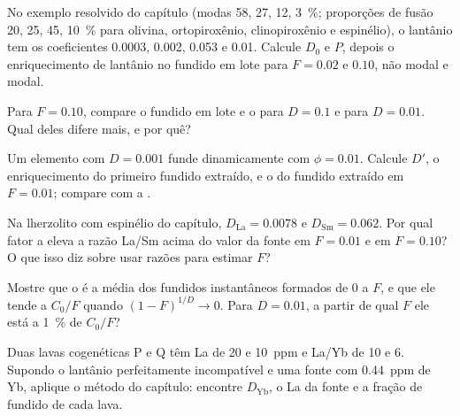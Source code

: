 \begin{exercise}[$\star\star$]\label{exo:b3:trace-element-modelling:6}
No exemplo resolvido do capítulo (modas 58, 27, 12, \qty{3}{\percent};
proporções de fusão 20, 25, 45, \qty{10}{\percent} para olivina,
ortopiroxênio, clinopiroxênio e espinélio), o lantânio tem os coeficientes
0.0003, 0.002, 0.053 e 0.01. Calcule $D_0$ e $P$, depois o enriquecimento de
lantânio no fundido em lote para $F = 0.02$ e $0.10$, não modal e modal.
\end{exercise}

\begin{exercise}[$\star\star$]\label{exo:b3:trace-element-modelling:7}
Para $F = 0.10$, compare o fundido em lote e o  para
$D = 0.1$ e para $D = 0.01$. Qual deles difere mais, e por quê?
\end{exercise}

\begin{exercise}[$\star\star$]\label{exo:b3:trace-element-modelling:8}
Um elemento com $D = 0.001$ funde dinamicamente com $\phi = 0.01$. Calcule
$D'$, o enriquecimento do primeiro fundido extraído, e o do fundido
extraído em $F = 0.01$; compare com a .
\end{exercise}

\begin{exercise}[$\star\star$]\label{exo:b3:trace-element-modelling:9}
Na lherzolito com espinélio do capítulo, $D_{\mathrm{La}} = 0.0078$ e
$D_{\mathrm{Sm}} = 0.062$. Por qual fator a  eleva a razão La/Sm acima
do valor da fonte em $F = 0.01$ e em $F = 0.10$? O que isso diz sobre
usar razões para estimar $F$?
\end{exercise}

\begin{exercise}[$\star\star\star$]\label{exo:b3:trace-element-modelling:10}
Mostre que o  é a média dos fundidos instantâneos
formados de 0 a $F$, e que ele tende a $C_0/F$ quando $(1 - F)^{1/D} \to 0$.
Para $D = 0.01$, a partir de qual $F$ ele está a \qty{1}{\percent} de $C_0/F$?
\end{exercise}

\begin{exercise}[$\star\star\star$]\label{exo:b3:trace-element-modelling:11}
Duas lavas cogenéticas P e Q têm La de 20 e \qty{10}{ppm} e La/Yb de 10 e 6.
Supondo o lantânio perfeitamente incompatível e uma fonte com
\qty{0.44}{ppm} de Yb, aplique o método do capítulo: encontre $D_{\mathrm{Yb}}$,
o La da fonte e a fração de fundido de cada lava.
\end{exercise}

